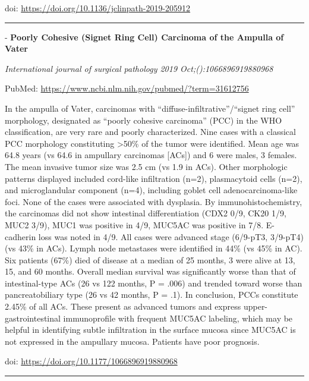 \documentclass[
]{article}
\renewcommand{\linethickness}{0.05em}
\begin{document}
doi: \url{https://doi.org/10.1136/jclinpath-2019-205912}

\begin{center}\rule{0.5\linewidth}{\linethickness}\end{center}

- \textbf{Poorly Cohesive (Signet Ring Cell) Carcinoma of the Ampulla of
Vater}

\emph{International journal of surgical pathology 2019
Oct;():1066896919880968}

PubMed: \url{https://www.ncbi.nlm.nih.gov/pubmed/?term=31612756}

In the ampulla of Vater, carcinomas with
``diffuse-infiltrative''/``signet ring cell'' morphology, designated as
``poorly cohesive carcinoma'' (PCC) in the WHO classification, are very
rare and poorly characterized. Nine cases with a classical PCC
morphology constituting \textgreater50\% of the tumor were identified.
Mean age was 64.8 years (vs 64.6 in ampullary carcinomas {[}ACs{]}) and
6 were males, 3 females. The mean invasive tumor size was 2.5 cm (vs 1.9
in ACs). Other morphologic patterns displayed included cord-like
infiltration (n=2), plasmacytoid cells (n=2), and microglandular
component (n=4), including goblet cell adenocarcinoma-like foci. None of
the cases were associated with dysplasia. By immunohistochemistry, the
carcinomas did not show intestinal differentiation (CDX2 0/9, CK20 1/9,
MUC2 3/9), MUC1 was positive in 4/9, MUC5AC was positive in 7/8.
E-cadherin loss was noted in 4/9. All cases were advanced stage
(6/9-pT3, 3/9-pT4) (vs 43\% in ACs). Lymph node metastases were
identified in 44\% (vs 45\% in AC). Six patients (67\%) died of disease
at a median of 25 months, 3 were alive at 13, 15, and 60 months. Overall
median survival was significantly worse than that of intestinal-type ACs
(26 vs 122 months, P = .006) and trended toward worse than
pancreatobiliary type (26 vs 42 months, P = .1). In conclusion, PCCs
constitute 2.45\% of all ACs. These present as advanced tumors and
express upper-gastrointestinal immunoprofile with frequent MUC5AC
labeling, which may be helpful in identifying subtle infiltration in the
surface mucosa since MUC5AC is not expressed in the ampullary mucosa.
Patients have poor prognosis.

doi: \url{https://doi.org/10.1177/1066896919880968}

\begin{center}\rule{0.5\linewidth}{\linethickness}\end{center}
\end{document}
